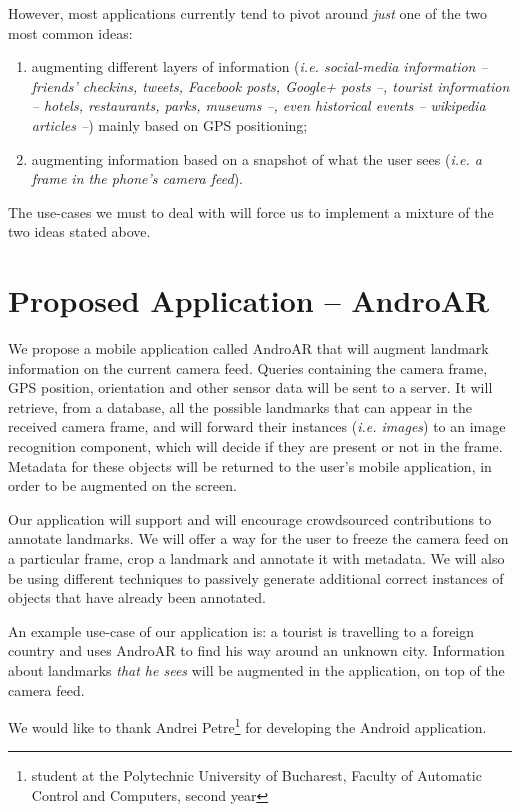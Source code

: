 \documentclass[a4paper,onecolumn,oneside,titlepage,11pt]{report}
\begin{document}
However, most applications currently tend to pivot around \emph{just} one of the two most common ideas:
\begin{enumerate}
	\item augmenting different layers of information (\emph{i.e. social-media information -- friends' checkins, tweets, Facebook posts, Google+ posts --, tourist information -- hotels, restaurants, parks, museums --, even historical events -- wikipedia articles --}) mainly based on GPS positioning;
	\item augmenting information based on a snapshot of what the user sees (\emph{i.e. a frame in the phone's camera feed}).
\end{enumerate}
The use-cases we must to deal with will force us to implement a mixture of the two ideas stated above.

\section{Proposed Application -- AndroAR}
We propose a mobile application called AndroAR that will augment landmark information on the current camera feed. Queries containing the camera frame, GPS position, orientation and other sensor data will be sent to a server. It will retrieve, from a database, all the possible landmarks that can appear in the received camera frame, and will forward their instances (\emph{i.e. images}) to an image recognition component, which will decide if they are present or not in the frame. Metadata for these objects will be returned to the user's mobile application, in order to be augmented on the screen.

Our application will support and will encourage crowdsourced contributions to annotate landmarks. We will offer a way for the user to freeze the camera feed on a particular frame, crop a landmark and annotate it with metadata. We will also be using different techniques to passively generate additional correct instances of objects that have already been annotated.

An example use-case of our application is: a tourist is travelling to a foreign country and uses AndroAR to find his way around an unknown city. Information about landmarks \emph{that he sees} will be augmented in the application, on top of the camera feed.

We would like to thank Andrei Petre\footnote{student at the Polytechnic University of Bucharest, Faculty of Automatic Control and Computers, second year} for developing the Android application.
\end{document}
